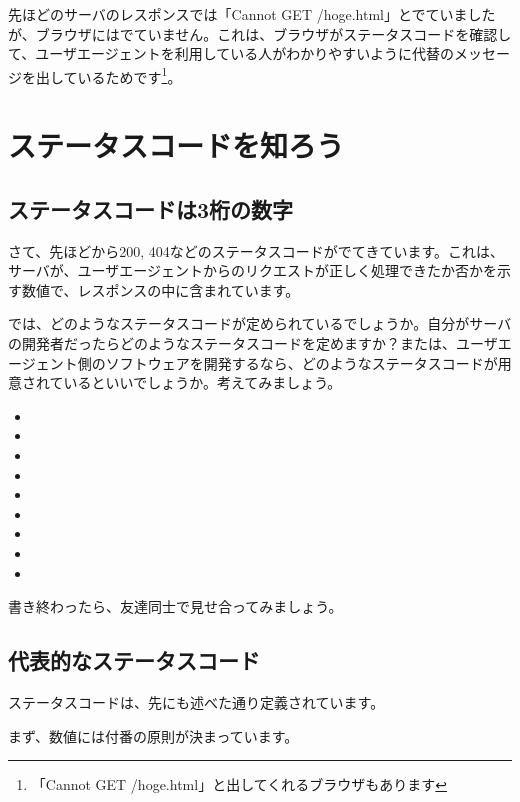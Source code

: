 \documentclass[a4j,11pt,openany]{jsbook}
\begin{document}
先ほどのサーバのレスポンスでは「Cannot GET /hoge.html」とでていましたが、ブラウザにはでていません。これは、ブラウザがステータスコードを確認して、ユーザエージェントを利用している人がわかりやすいように代替のメッセージを出しているためです\footnote{「Cannot GET /hoge.html」と出してくれるブラウザもあります}。

\chapter{ステータスコードを知ろう}

\section{ステータスコードは3桁の数字}

さて、先ほどから200, 404などのステータスコードがでてきています。これは、サーバが、ユーザエージェントからのリクエストが正しく処理できたか否かを示す数値で、レスポンスの中に含まれています。

では、どのようなステータスコードが定められているでしょうか。自分がサーバの開発者だったらどのようなステータスコードを定めますか？または、ユーザエージェント側のソフトウェアを開発するなら、どのようなステータスコードが用意されているといいでしょうか。考えてみましょう。

\begin{HUGE}
    \begin{itemize}
        \item 
        \item 
        \item 
        \item 
        \item 
        \item 
        \item 
        \item 
        \item 
    \end{itemize}
\end{HUGE}

書き終わったら、友達同士で見せ合ってみましょう。

\section{代表的なステータスコード}

ステータスコードは、先にも述べた通り定義されています。

まず、数値には付番の原則が決まっています。
\end{document}
